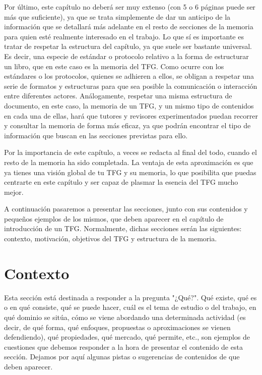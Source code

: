 Por último, este capítulo no deberá ser muy extenso (con 5 o 6 páginas puede ser más que suficiente), ya que se trata simplemente de dar un anticipo de la información que se detallará más adelante en el resto de secciones de la memoria para quien esté realmente interesado en el trabajo. Lo que sí es importante es tratar de respetar la estructura del capítulo, ya que suele ser bastante universal. Es decir, una especie de estándar o protocolo relativo a la forma de estructurar un libro, que en este caso es la memoria del TFG. Como ocurre con los estándares o los protocolos, quienes se adhieren a ellos, se obligan a respetar una serie de formatos y estructuras para que sea posible la comunicación o interacción entre diferentes actores. Análogamente, respetar una misma estructura de documento, en este caso, la memoria de un TFG, y un mismo tipo de contenidos en cada una de ellas, hará que tutores y revisores experimentados puedan recorrer y consultar la memoria de forma más eficaz, ya que podrán encontrar el tipo de información que buscan en las secciones previstas para ello.

Por la importancia de este capítulo, a veces se redacta al final del todo, cuando el resto de la memoria ha sido completada. La ventaja de esta aproximación es que ya tienes una visión global de tu TFG y su memoria, lo que posibilita que puedas centrarte en este capítulo y ser capaz de plasmar la esencia del TFG mucho mejor.

A continuación pasaremos a presentar las secciones, junto con sus contenidos y pequeños ejemplos de los mismos, que deben aparecer en el capítulo de introducción de un TFG. Normalmente, dichas secciones serán las siguientes: contexto, motivación, objetivos del TFG y estructura de la memoria.

\section{Contexto}\label{Contexto}
Esta sección está destinada a responder a la pregunta "¿Qué?". Qué existe, qué es o en qué consiste, qué se puede hacer, cuál es el tema de estudio o del trabajo, en qué dominio se sitúa, cómo se viene abordando una determinada actividad (es decir, de qué forma, qué enfoques, propuestas o aproximaciones se vienen defendiendo), qué propiedades, qué mercado, qué permite, etc., son ejemplos de cuestiones que debemos responder a la hora de presentar el contenido de esta sección. Dejamos por aquí algunas pistas o sugerencias de contenidos de que deben aparecer.

